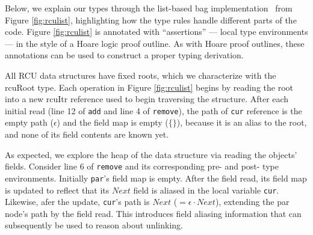 Below, we explain our types through the list-based bag implementation~\cite{McKenney2015SomeEO} from Figure \ref{fig:rculist}, highlighting how the type rules handle different parts of the code.
Figure \ref{fig:rculist} is annotated with ``assertions'' --- local type environments --- in the style of a Hoare logic proof outline.  As with Hoare proof outlines, these annotations can be used to construct a proper typing derivation.

All \textsf{RCU} data structures have fixed roots, which we characterize with the \textsf{rcuRoot} type.  Each operation in Figure \ref{fig:rculist} begins by reading the root into a new \textsf{rcuItr} reference used to begin traversing the structure.
After each initial read (line 12 of \lstinline|add| and line 4 of \lstinline|remove|), the path of \texttt{cur} reference is the empty path ($\epsilon$) and the field map is empty ($\{\}$), because it is an alias to the root, and none of its field contents are known yet.

As expected, we explore the heap of the data structure via reading the objects' fields. 
Consider line 6 of \lstinline|remove| and its corresponding pre- and post- type environments.  Initially \texttt{par}'s field map is empty.  After the field read, its field map is updated to reflect that its $Next$ field is aliased in the local variable \texttt{cur}.  Likewise, afer the update, \texttt{cur}'s path is $Next$ ($=\epsilon\cdot Next$), extending the par node's path by the field read.  This introduces field aliasing information that can subsequently be used to reason about unlinking.

